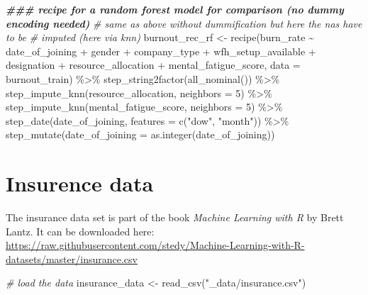 \documentclass[
]{book}
\newenvironment{Shaded}{\begin{snugshade}}{\end{snugshade}}
\newcommand{\AttributeTok}[1]{\textcolor[rgb]{0.77,0.63,0.00}{#1}}
\newcommand{\CommentTok}[1]{\textcolor[rgb]{0.56,0.35,0.01}{\textit{#1}}}
\newcommand{\DecValTok}[1]{\textcolor[rgb]{0.00,0.00,0.81}{#1}}
\newcommand{\DocumentationTok}[1]{\textcolor[rgb]{0.56,0.35,0.01}{\textbf{\textit{#1}}}}
\newcommand{\FunctionTok}[1]{\textcolor[rgb]{0.00,0.00,0.00}{#1}}
\newcommand{\NormalTok}[1]{#1}
\newcommand{\OtherTok}[1]{\textcolor[rgb]{0.56,0.35,0.01}{#1}}
\newcommand{\SpecialCharTok}[1]{\textcolor[rgb]{0.00,0.00,0.00}{#1}}
\newcommand{\StringTok}[1]{\textcolor[rgb]{0.31,0.60,0.02}{#1}}
\begin{document}
\begin{Shaded}
\begin{Highlighting}[]
\DocumentationTok{\#\#\# recipe for a random forest model for comparison (no dummy encoding needed)}
\CommentTok{\# same as above without dummification but here the na\textquotesingle{}s have to be}
\CommentTok{\# imputed (here via knn)}
\NormalTok{burnout\_rec\_rf }\OtherTok{\textless{}{-}} \FunctionTok{recipe}\NormalTok{(burn\_rate }\SpecialCharTok{\textasciitilde{}}\NormalTok{ date\_of\_joining }\SpecialCharTok{+}\NormalTok{ gender }\SpecialCharTok{+}
\NormalTok{                         company\_type }\SpecialCharTok{+}\NormalTok{ wfh\_setup\_available }\SpecialCharTok{+}
\NormalTok{                         designation }\SpecialCharTok{+}\NormalTok{ resource\_allocation }\SpecialCharTok{+}
\NormalTok{                         mental\_fatigue\_score,}
                         \AttributeTok{data =}\NormalTok{ burnout\_train) }\SpecialCharTok{\%\textgreater{}\%}
  \FunctionTok{step\_string2factor}\NormalTok{(}\FunctionTok{all\_nominal}\NormalTok{()) }\SpecialCharTok{\%\textgreater{}\%}
  \FunctionTok{step\_impute\_knn}\NormalTok{(resource\_allocation, }\AttributeTok{neighbors =} \DecValTok{5}\NormalTok{) }\SpecialCharTok{\%\textgreater{}\%}
  \FunctionTok{step\_impute\_knn}\NormalTok{(mental\_fatigue\_score, }\AttributeTok{neighbors =} \DecValTok{5}\NormalTok{) }\SpecialCharTok{\%\textgreater{}\%}
  \FunctionTok{step\_date}\NormalTok{(date\_of\_joining, }\AttributeTok{features =} \FunctionTok{c}\NormalTok{(}\StringTok{"dow"}\NormalTok{, }\StringTok{"month"}\NormalTok{)) }\SpecialCharTok{\%\textgreater{}\%}
  \FunctionTok{step\_mutate}\NormalTok{(}\AttributeTok{date\_of\_joining =} \FunctionTok{as.integer}\NormalTok{(date\_of\_joining))}
\end{Highlighting}
\end{Shaded}

\hypertarget{insurence-data}{%
\section{Insurence data}\label{insurence-data}}

The insurance data set is part of the book \emph{Machine Learning with R} by Brett Lantz. It can be downloaded here: \url{https://raw.githubusercontent.com/stedy/Machine-Learning-with-R-datasets/master/insurance.csv}

\begin{Shaded}
\begin{Highlighting}[]
\CommentTok{\# load the data}
\NormalTok{insurance\_data }\OtherTok{\textless{}{-}} \FunctionTok{read\_csv}\NormalTok{(}\StringTok{"\_data/insurance.csv"}\NormalTok{)}
\end{Highlighting}
\end{Shaded}
\end{document}
